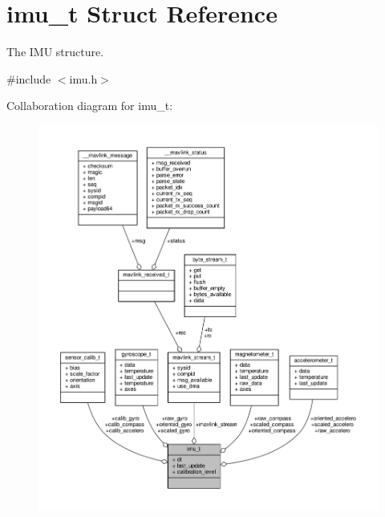 \hypertarget{structimu__t}{\section{imu\+\_\+t Struct Reference}
\label{structimu__t}
}


The I\+M\+U structure.  




{\ttfamily \#include $<$imu.\+h$>$}



Collaboration diagram for imu\+\_\+t\+:
\nopagebreak
\begin{figure}[H]
\begin{center}
\leavevmode
\includegraphics[width=350pt]{structimu__t__coll__graph}
\end{center}
\end{figure}
